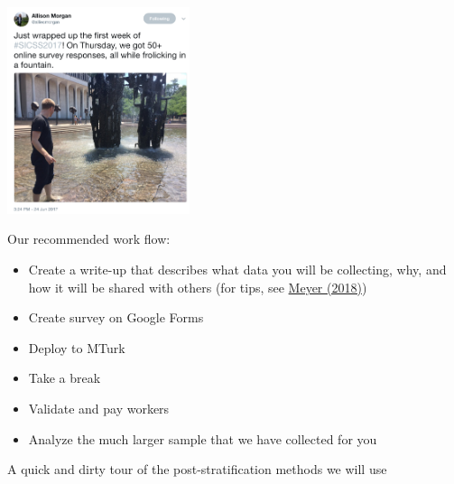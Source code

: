 \documentclass[aspectratio=169]{beamer}
\begin{document}
\begin{frame}

\begin{center}
\includegraphics[width=0.4\textwidth]{figures/morgan_tweet}
\end{center}

\end{frame}
\begin{frame}

Our recommended work flow:
\begin{itemize}
\item Create a write-up that describes what data you will be collecting, why, and how it will be shared with others (for tips, see \href{https://doi.org/10.1177/2515245917747656}{Meyer (2018)})
\item Create survey on Google Forms
\item Deploy to MTurk
\item Take a break
\pause
\item Validate and pay workers
\pause
\item Analyze the much larger sample that we have collected for you
\end{itemize}

\end{frame}
\begin{frame}

A quick and dirty tour of the post-stratification methods we will use

\end{frame}
\end{document}
